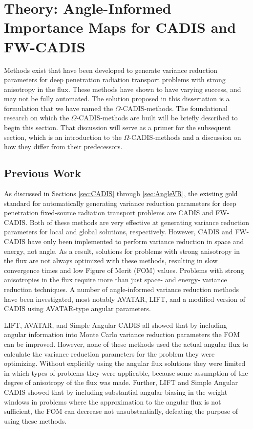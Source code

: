 \section{Theory: Angle-Informed Importance Maps for CADIS and FW-CADIS}
\label{sec:methodtheory}

Methods exist that have been developed to generate
variance reduction parameters
for deep penetration radiation transport problems with strong anisotropy in the
flux. These methods have shown to have varying success, and may not be fully
automated. The solution proposed in this dissertation is a formulation that we
have named the $\Omega$-CADIS-methods. The foundational research
on which the $\Omega$-CADIS-methods are built will be briefly described to begin this
section. That discussion will serve as a primer for the subsequent section, which
is an introduction to the $\Omega$-CADIS-methods and a discussion on how they differ
from their predecessors.

\subsection{Previous Work}
\label{sec:omegabknd}

As discussed in Sections \ref{sec:CADIS}
through \ref{sec:AngleVR}, the existing gold standard for automatically
generating variance reduction parameters for deep penetration
fixed-source radiation transport problems are
CADIS and FW-CADIS. Both of these methods are very effective at
generating variance reduction parameters for local and global solutions,
respectively. However, CADIS and FW-CADIS have only been implemented
to perform variance reduction in
space and energy, not angle. As a result, solutions for problems with
strong anisotropy in the flux are not always optimized with these methods,
resulting in slow convergence times and low Figure of Merit (FOM) values.
Problems with strong anisotropies in the flux require more than just
space- and energy- variance reduction techniques.
A number of angle-informed variance reduction methods have been
investigated, most notably AVATAR, LIFT, and a modified version of
CADIS using AVATAR-type angular parameters.

LIFT, AVATAR, and Simple Angular CADIS all showed that by including angular
information into Monte Carlo variance reduction parameters the FOM can be
improved. However, none of these methods used the actual angular flux to
calculate the variance reduction parameters for the problem they were
optimizing. Without explicitly using the angular flux solutions they were
limited in which types of problems they were applicable, because some assumption
of the degree of anisotropy of the flux was made. Further, LIFT and
Simple Angular CADIS showed that by including substantial angular biasing in the
weight windows in problems where the approximation to the angular flux is not
sufficient, the FOM can decrease not unsubstantially, defeating the purpose of using
these methods.

